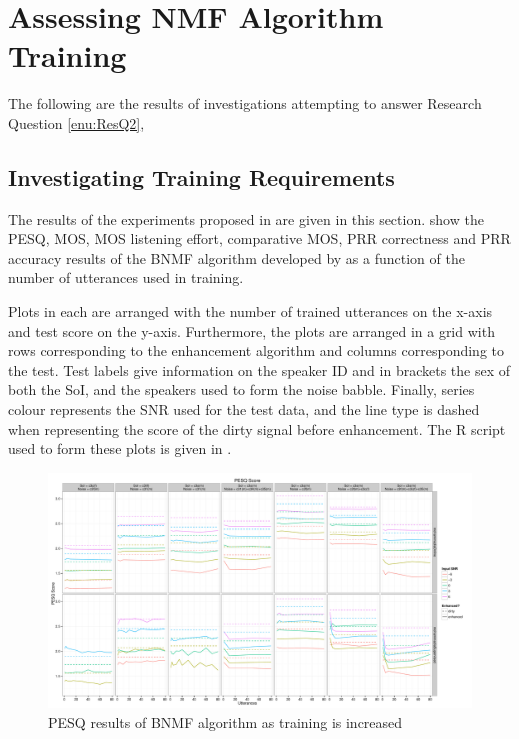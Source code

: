 \section{Assessing \acl{NMF} Algorithm Training}

The following are the results of investigations attempting to answer
Research Question \ref{enu:ResQ2}, \textit{\RQtwo{}}


\subsection{Investigating Training Requirements}

The results of the experiments proposed in 
are given in this section. 
show the \ac{PESQ}, \ac{MOS}, \ac{MOS} listening effort, comparative
\ac{MOS}, \ac{PRR} correctness and \ac{PRR} accuracy results of
the \ac{BNMF} algorithm developed by \citet{mohammadiha2013supervised}
as a function of the number of utterances used in training.

Plots in 
each are arranged with the number of trained utterances on the x-axis
and test score on the y-axis. Furthermore, the plots are arranged
in a grid with rows corresponding to the enhancement algorithm and
columns corresponding to the test. Test labels give information on
the speaker ID and in brackets the sex of both the SoI, and the speakers
used to form the noise babble. Finally, series colour represents the
\ac{SNR} used for the test data, and the line type is dashed when
representing the score of the dirty signal before enhancement. The
R script used to form these plots is given in .

\begin{figure}[p]
\noindent \begin{centering}
\includegraphics[angle=90,width=1\textwidth,height=0.95\textheight,keepaspectratio]{fig/R/train/pesq}
\par\end{centering}

\protect\caption{\label{fig:vary-train-pesq}\acs{PESQ} results of \acs{BNMF} algorithm
as training is increased}
\end{figure}


